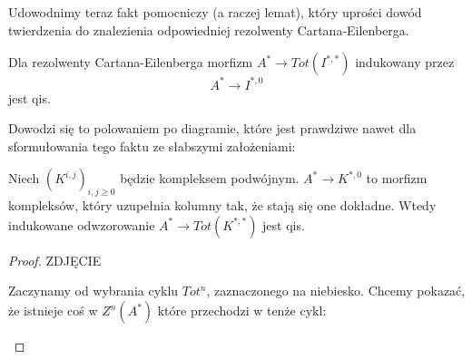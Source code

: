   Udowodnimy teraz fakt pomocniczy (a raczej lemat), który uprości dowód twierdzenia do znalezienia odpowiedniej rezolwenty Cartana-Eilenberga.

\begin{fact}
  Dla rezolwenty Cartana-Eilenberga morfizm $A^*\to Tot(I^{*,*})$ indukowany przez 
  $$A^*\to I^{*,0}$$ 
  jest qis. 
\end{fact}

Dowodzi się to polowaniem po diagramie, które jest prawdziwe nawet dla sformułowania tego faktu ze słabszymi założeniami:
\begin{lemma}
  Niech $(K^{i,j})_{i,j\geq 0}$ będzie kompleksem podwójnym. $A^*\to K^{*,0}$ to morfizm kompleksów, który uzupełnia kolumny tak, że stają się one dokładne. Wtedy indukowane odwzorowanie $A^*\to Tot(K^{*,*})$ jest qis.
\end{lemma}

\begin{proof}
  {\large\color{red}ZDJĘCIE}

  Zaczynamy od wybrania cyklu $Tot^n$, zaznaczonego na niebiesko. Chcemy pokazać, że istnieje coś w $Z^n(A^*)$ które przechodzi w tenże cykl:
  \begin{center}\end{center}
\end{proof}




